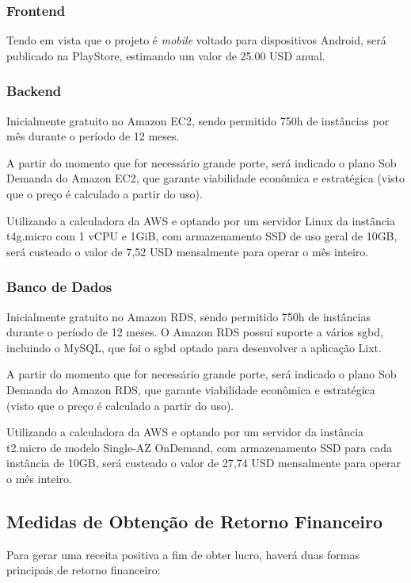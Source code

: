 \subsubsection{Frontend} 

Tendo em vista que o projeto é \textit{mobile} voltado para dispositivos Android, será publicado na PlayStore, estimando um valor de 25.00 USD anual. 

\subsubsection{Backend}

Inicialmente gratuito no Amazon EC2, sendo permitido 750h de instâncias por mês durante o período de 12 meses.

A partir do momento que for necessário grande porte, será indicado o plano Sob Demanda do Amazon EC2, que garante viabilidade econômica e estratégica (visto que o preço é calculado a partir do uso). 

Utilizando a calculadora da AWS e optando por um servidor Linux da instância t4g.micro com 1 vCPU e 1GiB, com armazenamento SSD de uso geral de 10GB, será custeado o valor de 7,52 USD mensalmente para operar o mês inteiro.

\subsubsection{Banco de Dados} 

Inicialmente gratuito no Amazon RDS, sendo permitido 750h de instâncias durante o período de 12 meses. O Amazon RDS possui suporte a vários \gls{sgbd}, incluindo o MySQL, que foi o \gls{sgbd} optado para desenvolver a aplicação Lixt.

A partir do momento que for necessário grande porte, será indicado o plano Sob Demanda do Amazon RDS, que garante viabilidade econômica e estratégica (visto que o preço é calculado a partir do uso).

Utilizando a calculadora da AWS e optando por um servidor da instância t2.micro de modelo Single-AZ OnDemand, com armazenamento SSD para cada instância de 10GB, será custeado o valor de 27,74 USD mensalmente para operar o mês inteiro.

\subsection{Medidas de Obtenção de Retorno Financeiro}

Para gerar uma receita positiva a fim de obter lucro, haverá duas formas principais de retorno financeiro:

